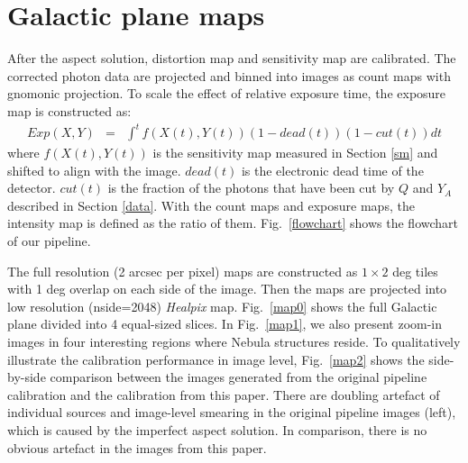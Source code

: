 \documentclass[12pt, preprint]{aastex}
\newcommand{\project}[1]{\textsl{#1}}
\begin{document}
\section{Galactic plane maps}
\label{maps}
After the aspect solution, distortion map and sensitivity map are calibrated.
The corrected photon data are projected and binned into images as count maps with gnomonic projection.
To scale the effect of relative exposure time, the exposure map is constructed as:
\begin{eqnarray}
Exp(X,Y) &=& \int^{t}f(X(t), Y(t))(1-dead(t))(1-cut(t))dt
\end{eqnarray}
where $f(X(t), Y(t))$ is the sensitivity map measured in Section \ref{sm} and shifted to align with the image.
$dead(t)$ is the electronic dead time of the detector.
$cut(t)$ is the fraction of the photons that have been cut by $Q$ and $Y_A$ described in Section \ref{data}.
With the count maps and exposure maps, the intensity map is defined as the ratio of them.
Fig.~\ref{flowchart} shows the flowchart of our pipeline.

The full resolution (2 arcsec per pixel) maps are constructed   as $1 \times 2$ deg tiles with 1 deg overlap on each side of the image.
Then the maps are projected into low resolution (nside=2048) \project{Healpix} map.
Fig.~\ref{map0} shows the full Galactic plane divided into 4 equal-sized slices.
In Fig.~\ref{map1}, we also present zoom-in images in four interesting regions where Nebula structures reside.
To qualitatively illustrate the calibration performance in image level, Fig.~\ref{map2} shows the side-by-side comparison between the images generated from the original pipeline calibration and the calibration from this paper.
There are doubling artefact of individual sources and image-level smearing in the original pipeline images (left), which is caused by the imperfect aspect solution.
In comparison, there is no obvious artefact in the images from this paper.
\end{document}
